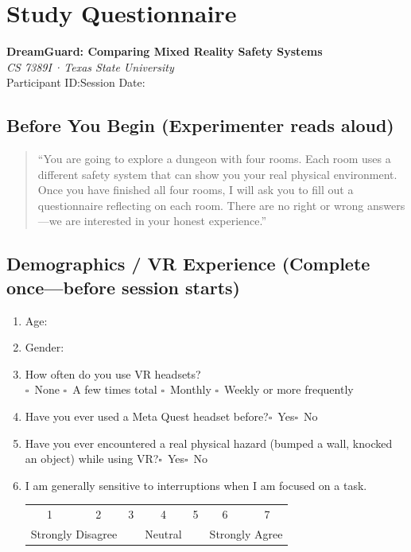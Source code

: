 \documentclass{styling/vgtc} %
\makeatletter
\newcommand{\likert}{%
  \par\smallskip
  \begin{center}\small
  \begin{tabular}{@{}ccccccc@{}}
    1 & 2 & 3 & 4 & 5 & 6 & 7 \\[-2pt]
    \multicolumn{2}{l}{\scriptsize Strongly Disagree} &
    & {\scriptsize Neutral} &
    & \multicolumn{2}{r}{\scriptsize Strongly Agree}
  \end{tabular}
  \end{center}\smallskip\noindent}
\makeatother
\begin{document}
\clearpage\onecolumn
\appendix
\section{Study Questionnaire}
\label{app:survey}

\begin{center}
  {\large\textbf{DreamGuard: Comparing Mixed Reality Safety Systems}}\\[4pt]
  \textit{CS 7389I\,·\,Texas State University}\\[6pt]
  Participant ID:\;\underline{\hspace{3cm}}\qquad Session Date:\;\underline{\hspace{3cm}}
\end{center}

\bigskip

\subsection*{Before You Begin \textnormal{\small(Experimenter reads aloud)}}

\begin{quote}
``You are going to explore a dungeon with four rooms. Each room uses a different safety system that can show you your real physical environment. Once you have finished all four rooms, I will ask you to fill out a questionnaire reflecting on each room. There are no right or wrong answers---we are interested in your honest experience.''
\end{quote}

\subsection*{Demographics / VR Experience \textnormal{\small(Complete once---before session starts)}}

\begin{enumerate}
  \item Age:\;\underline{\hspace{3cm}}
  \item Gender:\;\underline{\hspace{3cm}}
  \item How often do you use VR headsets?\\[4pt]
        $\square$~None\qquad
        $\square$~A few times total\qquad
        $\square$~Monthly\qquad
        $\square$~Weekly or more frequently
  \item Have you ever used a Meta Quest headset before?\quad $\square$~Yes\quad $\square$~No
  \item Have you ever encountered a real physical hazard (bumped a wall, knocked an object) while using VR?\quad $\square$~Yes\quad $\square$~No
  \item I am generally sensitive to interruptions when I am focused on a task.\likert
\end{enumerate}
\end{document}

